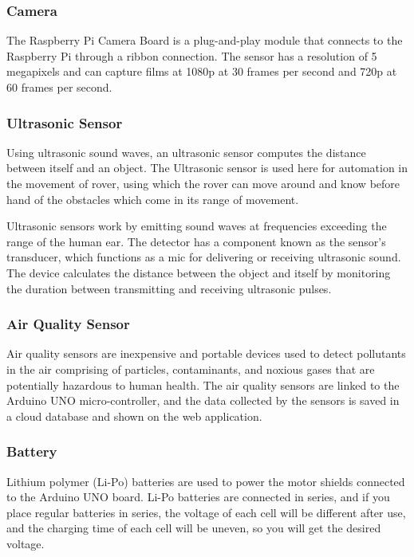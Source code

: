 \documentclass[conference,a4paper]{IEEEtran}
\begin{document}
\subsubsection{Camera}
The Raspberry Pi Camera Board is a plug-and-play module that connects to the Raspberry Pi through a ribbon connection. The sensor has a resolution of 5 megapixels and can capture films at 1080p at 30 frames per second and 720p at 60 frames per second.

\subsubsection{Ultrasonic Sensor}
Using ultrasonic sound waves, an ultrasonic sensor computes the distance between itself and an object. The Ultrasonic sensor is used here for automation in the movement of rover, using which the rover can move around and know before hand of the obstacles which come in its range of movement.\cite{14}

Ultrasonic sensors work by emitting sound waves at frequencies exceeding the range of the human ear. The detector has a component known as the sensor's transducer, which functions as a mic for delivering or receiving ultrasonic sound. The device calculates the distance between the object and itself by monitoring the duration between transmitting and receiving ultrasonic pulses.\cite{15}

\subsubsection{Air Quality Sensor}
Air quality sensors are inexpensive and portable devices used to detect pollutants in the air comprising of particles, contaminants, and noxious gases that are potentially hazardous to human health. The air quality sensors are linked to the Arduino UNO micro-controller, and the data collected by the sensors is saved in a cloud database and shown on the web application. \cite{16}

\subsubsection{Battery}
Lithium polymer (Li-Po) batteries are used to power the motor shields connected to the Arduino UNO board. Li-Po batteries are connected in series, and if you place regular batteries in series, the voltage of each cell will be different after use, and the charging time of each cell will be uneven, so you will get the desired voltage.
\end{document}
